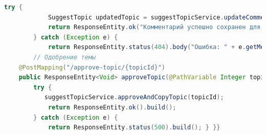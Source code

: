 \documentclass[14pt]{extarticle} %
\begin{document}
\begin{lstlisting}[language=Java, caption={Контроллер предложенных тем}]
        try {
            SuggestTopic updatedTopic = suggestTopicService.updateComment(topicId, comment);
            return ResponseEntity.ok("Комментарий успешно сохранен для темы: " + updatedTopic.getName());
        } catch (Exception e) {
            return ResponseEntity.status(404).body("Ошибка: " + e.getMessage()); }}
        // Одобрение темы
    @PostMapping("/approve-topic/{topicId}")
    public ResponseEntity<Void> approveTopic(@PathVariable Integer topicId) {
        try {
           suggestTopicService.approveAndCopyTopic(topicId);
            return ResponseEntity.ok().build();
        } catch (Exception e) {
            return ResponseEntity.status(500).build(); } }}
\end{lstlisting}

\label{topicLockController}
\end{document}
